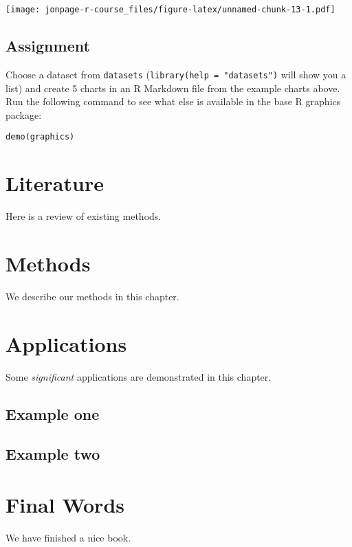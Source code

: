 \documentclass[]{book}
\begin{document}
\texttt{[image: jonpage-r-course\_files/figure-latex/unnamed-chunk-13-1.pdf]}

\section{Assignment}\label{assignment}

Choose a dataset from \texttt{datasets}
(\texttt{library(help\ =\ "datasets")} will show you a list) and create
5 charts in an R Markdown file from the example charts above. Run the
following command to see what else is available in the base R graphics
package:

\begin{verbatim}
demo(graphics)
\end{verbatim}

\chapter{Literature}\label{literature}

Here is a review of existing methods.

\chapter{Methods}\label{methods}

We describe our methods in this chapter.

\chapter{Applications}\label{applications}

Some \emph{significant} applications are demonstrated in this chapter.

\section{Example one}\label{example-one}

\section{Example two}\label{example-two}

\chapter{Final Words}\label{final-words}

We have finished a nice book.
\end{document}
